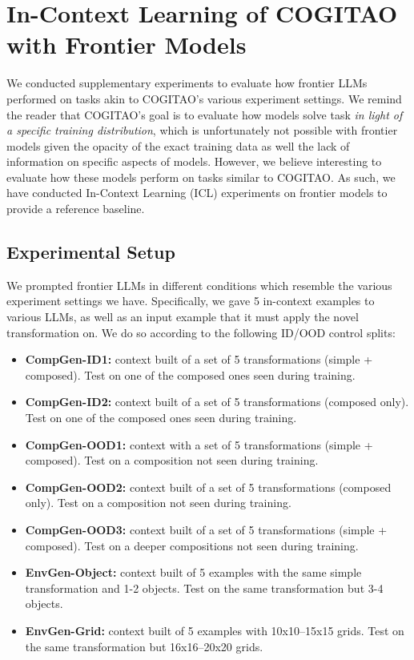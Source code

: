 \section{In-Context Learning of COGITAO with Frontier Models}\label{appendix:llm_results}

We conducted supplementary experiments to evaluate how frontier LLMs performed on tasks akin to COGITAO's various experiment settings. We remind the reader that  COGITAO's goal is to evaluate how models solve task \textit{in light of a specific training distribution}, which is unfortunately not possible with frontier models given the opacity of the exact training data as well the lack of information on specific aspects of models. However, we believe interesting to evaluate how these models perform on tasks similar to COGITAO. As such, we have conducted In-Context Learning (ICL) experiments on frontier models to provide a reference baseline. 

\subsection{Experimental Setup}

We prompted frontier LLMs in different conditions which resemble the various experiment settings we have. Specifically, we gave 5 in-context examples to various LLMs, as well as an input example that it must apply the novel transformation on. We do so according to the following ID/OOD control splits:

\begin{itemize}
    \item \textbf{CompGen-ID1:} context built of a set of 5 transformations (simple + composed). Test on one of the composed ones seen during training.
    \item \textbf{CompGen-ID2:} context built of a set of 5 transformations (composed only). Test on one of the composed ones seen during training.
    \item \textbf{CompGen-OOD1:} context with a set of 5 transformations (simple + composed). Test on a composition not seen during training.
    \item \textbf{CompGen-OOD2:} context built of a set of 5 transformations (composed only). Test on a composition not seen during training.
    \item \textbf{CompGen-OOD3:} context built of a set of 5 transformations (simple + composed). Test on a deeper compositions not seen during training.
    \item \textbf{EnvGen-Object:} context built of 5 examples with the same simple transformation and 1-2 objects. Test on the same transformation but 3-4 objects.
    \item \textbf{EnvGen-Grid:} context built of 5 examples with 10x10--15x15 grids. Test on the same transformation but 16x16--20x20 grids.
\end{itemize}

